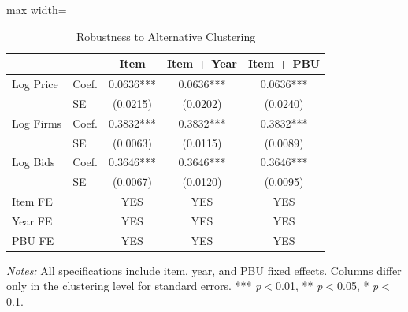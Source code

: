 \begin{table}[htbp]
\centering
\caption{Robustness to Alternative Clustering}
\label{tab:clustering_robustness}
\begin{adjustbox}{max width=\textwidth}
\begin{threeparttable}
\small
\begin{tabular}{llccc}
\toprule
 & & Item & Item + Year & Item + PBU \\
\midrule
Log Price & Coef. & 0.0636*** & 0.0636*** & 0.0636*** \\
 & SE & (0.0215) & (0.0202) & (0.0240) \\
Log Firms & Coef. & 0.3832*** & 0.3832*** & 0.3832*** \\
 & SE & (0.0063) & (0.0115) & (0.0089) \\
Log Bids & Coef. & 0.3646*** & 0.3646*** & 0.3646*** \\
 & SE & (0.0067) & (0.0120) & (0.0095) \\
\midrule
Item FE & & YES & YES & YES \\
Year FE & & YES & YES & YES \\
PBU FE & & YES & YES & YES \\
\bottomrule
\end{tabular}
\begin{tablenotes}
\small
\item \textit{Notes:} All specifications include item, year, and PBU fixed effects.
Columns differ only in the clustering level for standard errors.
*** \textit{p}$<$0.01, ** \textit{p}$<$0.05, * \textit{p}$<$0.1.
\end{tablenotes}
\end{threeparttable}
\end{adjustbox}
\end{table}
